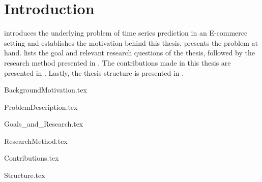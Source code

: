 \chapter{Introduction}
\label{cha:Introduction}

introduces the underlying problem of time series prediction in an E-commerce setting and establishes the motivation behind this thesis.
 presents the problem at hand.
 lists the goal and relevant research questions of the thesis,
followed by the research method presented in .
The contributions made in this thesis are presented in .
Lastly, the thesis structure is presented in .



{BackgroundMotivation.tex}

{ProblemDescription.tex}

{Goals_and_Research.tex}

{ResearchMethod.tex}

{Contributions.tex}

{Structure.tex}
